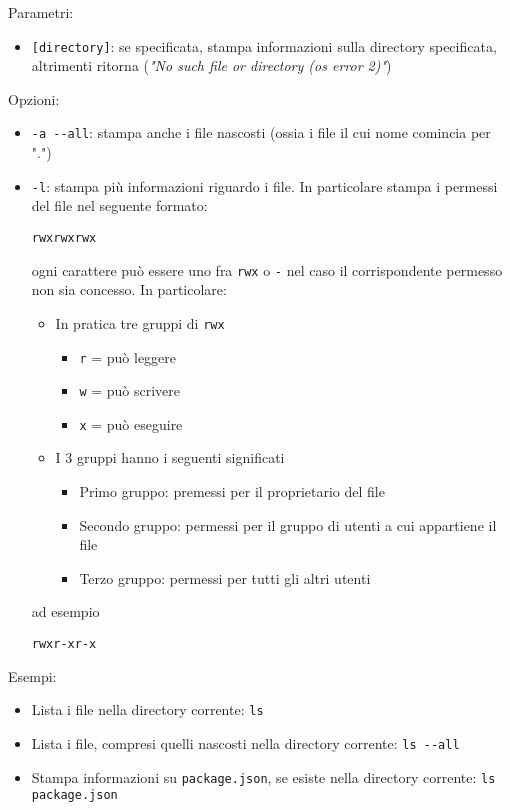 \vskip3mm
Parametri:
\begin{itemize}
	\item \verb|[directory]|: se specificata, stampa informazioni sulla directory specificata, altrimenti ritorna (\textit{"No such file or directory (os error 2)"})
\end{itemize}
Opzioni:
\begin{itemize}
	\item \verb|-a --all|: stampa anche i file nascosti (ossia i file il cui nome comincia per ".")
	\item \verb|-l|: stampa più informazioni riguardo i file. In particolare stampa i permessi del file nel seguente formato:
	      \begin{center}
		      \verb|rwxrwxrwx|
	      \end{center}
	      ogni carattere può essere uno fra \verb|rwx| o \verb|-| nel caso il corrispondente permesso non sia concesso. In particolare:
	      \begin{itemize}
		      \item In pratica tre gruppi di \verb|rwx|
		            \begin{itemize}
			            \item \verb|r| = può leggere
			            \item \verb|w| = può scrivere
			            \item \verb|x| = può eseguire
		            \end{itemize}
		      \item I 3 gruppi hanno i seguenti significati
		            \begin{itemize}
			            \item Primo gruppo: premessi per il proprietario del file
			            \item Secondo gruppo: permessi per il gruppo di utenti a cui appartiene il file
			            \item Terzo gruppo: permessi per tutti gli altri utenti
		            \end{itemize}
	      \end{itemize}
	      ad esempio
	      \begin{center}
		      \verb|rwxr-xr-x|
	      \end{center}
\end{itemize}
Esempi:
\begin{itemize}
	\item Lista i file nella directory corrente:
	      \vskip3mm
	      \verb|ls|
	\item Lista i file, compresi quelli nascosti nella directory corrente:
	      \vskip3mm
	      \verb|ls --all|
	\item Stampa informazioni su \verb|package.json|, se esiste nella directory corrente:
	      \vskip3mm
	      \verb|ls package.json|
\end{itemize}

